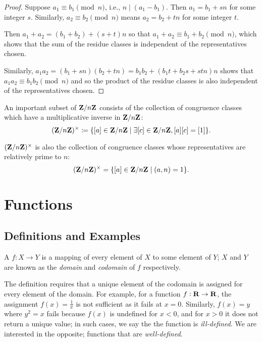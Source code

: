 \begin{example}
\begin{proof}
Suppose $a_1\equiv b_1\pmod n$, i.e., $n\mid(a_1-b_1)$. Then $a_1=b_1+sn$ for some integer $s$. Similarly, $a_2\equiv b_2\pmod n$ means $a_2=b_2+tn$ for some integer $t$.

Then $a_1+a_2=(b_1+b_2)+(s+t)n$ so that $a_1+a_2\equiv b_1+b_2\pmod n$, which shows that the sum of the residue classes is independent of the representatives chosen.

Similarly, $a_1a_2=(b_1+sn)(b_2+tn)=b_1b_2+(b_1t+b_2s+stn)n$ shows that $a_1a_2\equiv b_1b_2\pmod n$ and so the product of the residue classes is also independent of the representatives chosen.
\end{proof}

An important subset of $\mathbf Z/n\mathbf Z$ consists of the collection of congruence classes which have a multiplicative inverse in $\mathbf Z/n\mathbf Z$:
\[(\mathbf Z/n\mathbf Z)^\times\coloneqq\{[a]\in\mathbf Z/n\mathbf Z\mid\exists[c]\in\mathbf Z/n\mathbf Z,[a][c]=[1]\}.\]

\begin{proposition}
$(\mathbf Z/n\mathbf Z)^\times$ is also the collection of congruence classes whose representatives are relatively prime to $n$:
\[(\mathbf Z/n\mathbf Z)^\times=\{[a]\in\mathbf Z/n\mathbf Z\mid(a,n)=1\}.\]
\end{proposition}
\end{example}
\pagebreak

\section{Functions}
\subsection{Definitions and Examples}
\begin{definition}[Function]
A  $f:X\to Y$ is a mapping of every element of $X$ to some element of $Y$; $X$ and $Y$ are known as the \emph{domain} and \emph{codomain} of $f$ respectively.
\end{definition}

\begin{remark}
The definition requires that a unique element of the codomain is assigned for every element of the domain. For example, for a function $f:\mathbf R \to \mathbf R$, the assignment $f(x)=\frac{1}{x}$ is not sufficient as it fails at $x=0$. Similarly, $f(x)=y$ where $y^2=x$ fails because $f(x)$ is undefined for $x<0$, and for $x>0$ it does not return a unique value; in such cases, we say the the function is \emph{ill-defined}. We are interested in the opposite; functions that are \emph{well-defined}.
\end{remark}


